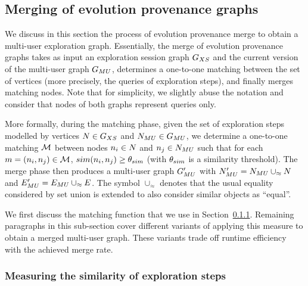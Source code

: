 \subsection{Merging of evolution provenance graphs}
\label{sec:fuse}


We discuss in this section the process of evolution provenance merge to obtain a multi-user exploration graph.
Essentially, the merge of evolution provenance graphs takes as input an exploration session graph $G_{XS}{}$ and the current version of the multi-user graph $G_{MU}{}$, determines a one-to-one matching between the set of vertices (more precisely, the queries of exploration steps), and finally merges matching nodes. Note that for simplicity, we slightly abuse the notation and consider that nodes of both graphs represent queries only.

More formally, during the matching phase, given the set of exploration steps modelled by vertices $N \in G_{XS}$ and $N_{MU} \in G_{MU}$, we determine a one-to-one matching ${\mathcal M}$ between nodes $ n_i \in N$ and $n_j \in N_{MU}$ such that for each $m = (n_i, n_j) \in {\mathcal M}$, $sim(n_i, n_j) \geq \theta_{sim}$ (with $\theta_{sim}$ is a similarity threshold). The merge phase then produces a multi-user graph $G_{MU}'$ with $N_{MU}' = N_{MU} \cup_{\approx} N$ and $E_{MU}' = E_{MU} \cup_{\approx} E$. The symbol $\cup_{\approx}$ denotes that the usual equality considered by set union is extended to also consider similar objects as ``equal''.



We first discuss the matching function that we use in Section~\ref{subsec:match-sim}. 
Remaining paragraphs in this sub-section cover different variants of applying this measure to obtain a merged multi-user graph. 
These variants trade off runtime efficiency with the achieved merge rate. 

\subsubsection{Measuring the similarity of exploration steps}
\label{subsec:match-sim}

